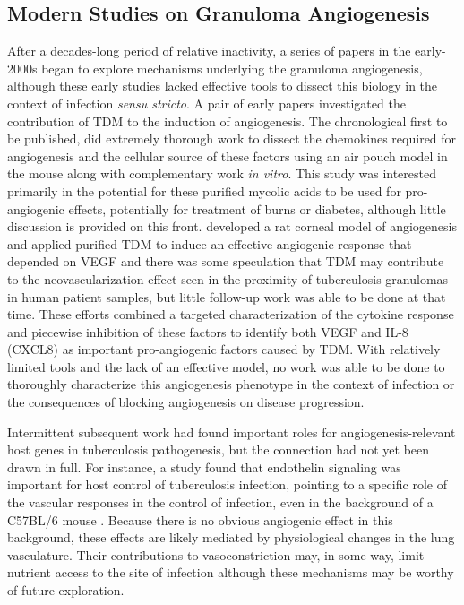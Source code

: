 \subsection{Modern Studies on Granuloma Angiogenesis}\label{granang}

After a decades\hyp{}long period of relative inactivity, a series of papers in the early\hyp{}2000s began to explore mechanisms underlying the granuloma angiogenesis, although these early studies lacked effective tools to dissect this biology in the context of infection \textit{sensu stricto}. A pair of early papers investigated the contribution of TDM to the induction of angiogenesis. The chronological first to be published, \citet{Sakaguchi2000} did extremely thorough work to dissect the chemokines required for angiogenesis and the cellular source of these factors using an air pouch model in the mouse along with complementary work \textit{in vitro}. This study was interested primarily in the potential for these purified mycolic acids to be used for pro\hyp{}angiogenic effects, potentially for treatment of burns or diabetes, although little discussion is provided on this front. \citet{Saita2000} developed a rat corneal model of angiogenesis and applied purified TDM to induce an effective angiogenic response that depended on VEGF and there was some speculation that TDM may contribute to the neovascularization effect seen in the proximity of tuberculosis granulomas in human patient samples, but little follow\hyp{}up work was able to be done at that time. These efforts combined a targeted characterization of the cytokine response and piecewise inhibition of these factors to identify both VEGF and IL\hyp{}8 (CXCL8) as important pro\hyp{}angiogenic factors caused by TDM. With relatively limited tools and the lack of an effective model, no work was able to be done to thoroughly characterize this angiogenesis phenotype in the context of infection or the consequences of blocking angiogenesis on disease progression.

Intermittent subsequent work had found important roles for angiogenesis\hyp{}relevant host genes in tuberculosis pathogenesis, but the connection had not yet been drawn in full. For instance, a study found that endothelin signaling was important for host control of tuberculosis infection, pointing to a specific role of the vascular responses in the control of infection, even in the background of a C57BL/6 mouse \citep{Correa2014}. Because there is no obvious angiogenic effect in this background, these effects are likely mediated by physiological changes in the lung vasculature. Their contributions to vasoconstriction may, in some way, limit nutrient access to the site of infection although these mechanisms may be worthy of future exploration.

